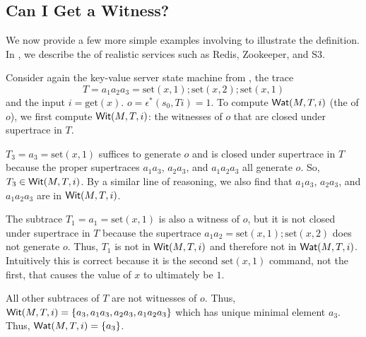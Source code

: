 \subsection{Can I Get a Witness?}
We now provide a few more simple examples involving \watprovenance{} to
illustrate the definition. In , we describe the
\watprovenance{} of realistic services such as Redis, Zookeeper, and S3.

\begin{example}
  \newcommand{\Mget}{\text{get}}
  \newcommand{\Mset}{\text{set}}
  Consider again the key-value server state machine from
  , the trace
  \[
    T = a_1 a_2 a_3 = \Mset(x, 1); \Mset(x, 2); \Mset(x, 1)
  \]
  and the input $i = \Mget(x)$. $o = \epsilon^*(s_0, Ti) = 1$. To compute
  $\textsf{Wat}(M, T, i)$ (the \watprovenance{} of $o$), we first compute $\textsf{Wit}(M, T,
  i)$: the witnesses of $o$ that are closed under supertrace in $T$.


  $T_3 = a_3 = \Mset(x, 1)$ suffices to generate $o$ and is closed under
  supertrace in $T$ because the proper supertraces $a_1a_3$, $a_2a_3$, and
  $a_1a_2a_3$ all generate $o$. So, $T_3 \in \textsf{Wit}(M, T, i)$. By a similar line
  of reasoning, we also find that $a_1a_3$, $a_2a_3$, and $a_1a_2a_3$ are in
  $\textsf{Wit}(M, T, i)$.

  The subtrace $T_1 = a_1 = \Mset(x, 1)$ is also a witness of $o$, but it is
  not closed under supertrace in $T$ because the supertrace $a_1a_2 = \Mset(x,
  1); \Mset(x, 2)$ does not generate $o$. Thus, $T_1$ is not in $\textsf{Wit}(M, T, i)$
  and therefore not in $\textsf{Wat}(M, T, i)$. Intuitively this is correct because it
  is the second $\Mset(x, 1)$ command, not the first, that causes the value of
  $x$ to ultimately be $1$.

  All other subtraces of $T$ are not witnesses of $o$. Thus, $\textsf{Wit}(M, T, i) =
  \{a_3, a_1a_3, a_2a_3, a_1a_2a_3\}$ which has unique minimal element $a_3$.
  Thus, $\textsf{Wat}(M, T, i) = \{a_3\}$.
\end{example}

